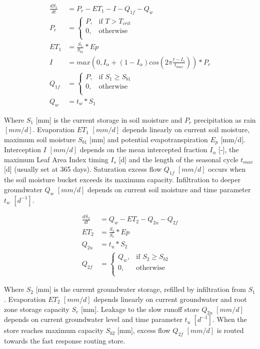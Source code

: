 \begin{align}
	\frac{dS_1}{dt} &= P_r-ET_1-I-Q_{1f}-Q_w \\
	P_r &= \begin{cases}
		P, &\text{if } T > T_{crit} \\
		0, & \text{otherwise} \\
	\end{cases} \\
	ET_1 &= \frac{S_1}{S_{b1}}*Ep\\
	I &=max\left(0,I_{\alpha} + (1-I_{\alpha})cos\left(2\pi\frac{t-I_{s}}{t_{max}}\right)\right)*P_r\\
	Q_{1f} &= \begin{cases}
		P, &\text{if } S_1 \geq S_{b1} \\
		0, & \text{otherwise} \\
	\end{cases} \\
	Q_w &= t_w*S_1
\end{align}

Where $S_1$ [mm] is the current storage in soil moisture and $P_r$ precipitation as rain $[mm/d]$. Evaporation $ET_1$ $[mm/d]$ depends linearly on current soil moisture, maximum soil moisture $S_{b1}$ [mm] and potential evapotranspiration $E_p$ [mm/d]. Interception $I$ $[mm/d]$ depends on the mean intercepted fraction $I_{\alpha}$ [-],  the maximum Leaf Area Index timing $I_{s}$ [d] and the length of the seasonal cycle $t_{max}$ [d] (usually set at 365 days). Saturation excess flow $Q_{1f}$  $[mm/d]$ occurs when the soil moisture bucket exceeds its maximum capacity. Infiltration to deeper groundwater $Q_w$  $[mm/d]$ depends on current soil moisture and time parameter $t_w$  $[d^{-1}]$.

\begin{align}
	\frac{dS_2}{dt} &= Q_w-ET_2-Q_{2u} - Q_{2f}\\
	ET_2 &= \frac{S_2}{S_{e}}*Ep\\
	Q_{2u} &= t_u*S_2\\
	Q_{2f} &= \begin{cases}
		Q_w, &\text{if } S_2 \geq S_{b2} \\
		0, & \text{otherwise} \\
	\end{cases}
\end{align}

Where $S_2$ [mm] is the current groundwater storage, refilled by infiltration from $S_1$. Evaporation $ET_2$ $[mm/d]$ depends linearly on current groundwater and root zone storage capacity $S_e$ [mm]. Leakage to the slow runoff store $Q_{2u}$ $[mm/d]$ depends on current groundwater level and time parameter $t_u$ $[d^{-1}]$. When the store reaches maximum capacity $S_{b2}$ [mm], excess flow $Q_{2f}$ $[mm/d]$ is routed towards the fast response routing store.

